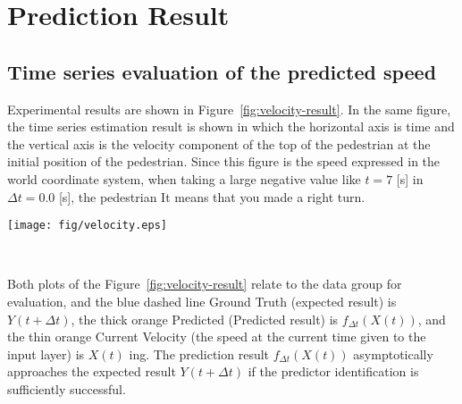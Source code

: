 \documentclass{sigchi}
\begin{document}
\section{Prediction Result}%

\subsection {Time series evaluation of the predicted speed}

Experimental results are shown in Figure~\ref{fig:velocity-result}. In the same figure, the time series estimation result is shown in which the horizontal axis is time and the vertical axis is the velocity component of the top of the pedestrian at the initial position of the pedestrian. Since this figure is the speed expressed in the world coordinate system, when taking a large negative value like $ t = 7 $ [s] in $ \Delta t = 0.0 $ [s], the pedestrian It means that you made a right turn.


\begin{figure*}
\centering
  \texttt{[image: fig/velocity.eps]}
  \caption{$ x $ speed prediction result in the axial direction ($ \Delta t $ represents the preceding time width)}~\label{fig:velocity-result}
\end{figure*}


Both plots of the Figure~\ref{fig:velocity-result} relate to the data group for evaluation, and the blue dashed line Ground Truth (expected result) is $ Y (t + \Delta t) $, the thick orange Predicted (Predicted result) is $ f_ {\Delta t} (X (t)) $, and the thin orange Current Velocity (the speed at the current time given to the input layer) is $ X (t) $ ing. The prediction result $ f_ {\Delta t} (X (t)) $ asymptotically approaches the expected result $ Y (t + \Delta t) $ if the predictor identification is sufficiently successful.
\end{document}
